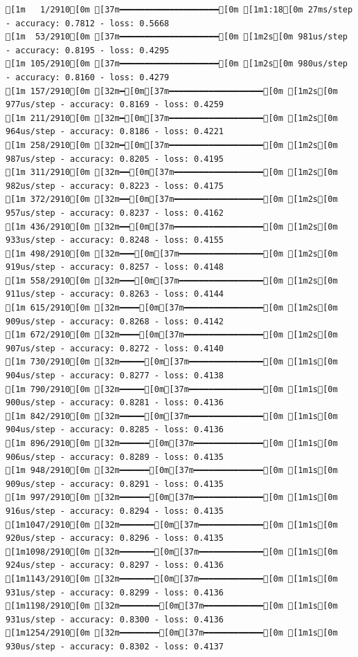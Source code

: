 \documentclass[
  letterpaper,
  DIV=11,
  numbers=noendperiod]{scrartcl}
\begin{document}
\begin{verbatim}
[1m   1/2910[0m [37m━━━━━━━━━━━━━━━━━━━━[0m [1m1:18[0m 27ms/step - accuracy: 0.7812 - loss: 0.5668
[1m  53/2910[0m [37m━━━━━━━━━━━━━━━━━━━━[0m [1m2s[0m 981us/step - accuracy: 0.8195 - loss: 0.4295 
[1m 105/2910[0m [37m━━━━━━━━━━━━━━━━━━━━[0m [1m2s[0m 980us/step - accuracy: 0.8160 - loss: 0.4279
[1m 157/2910[0m [32m━[0m[37m━━━━━━━━━━━━━━━━━━━[0m [1m2s[0m 977us/step - accuracy: 0.8169 - loss: 0.4259
[1m 211/2910[0m [32m━[0m[37m━━━━━━━━━━━━━━━━━━━[0m [1m2s[0m 964us/step - accuracy: 0.8186 - loss: 0.4221
[1m 258/2910[0m [32m━[0m[37m━━━━━━━━━━━━━━━━━━━[0m [1m2s[0m 987us/step - accuracy: 0.8205 - loss: 0.4195
[1m 311/2910[0m [32m━━[0m[37m━━━━━━━━━━━━━━━━━━[0m [1m2s[0m 982us/step - accuracy: 0.8223 - loss: 0.4175
[1m 372/2910[0m [32m━━[0m[37m━━━━━━━━━━━━━━━━━━[0m [1m2s[0m 957us/step - accuracy: 0.8237 - loss: 0.4162
[1m 436/2910[0m [32m━━[0m[37m━━━━━━━━━━━━━━━━━━[0m [1m2s[0m 933us/step - accuracy: 0.8248 - loss: 0.4155
[1m 498/2910[0m [32m━━━[0m[37m━━━━━━━━━━━━━━━━━[0m [1m2s[0m 919us/step - accuracy: 0.8257 - loss: 0.4148
[1m 558/2910[0m [32m━━━[0m[37m━━━━━━━━━━━━━━━━━[0m [1m2s[0m 911us/step - accuracy: 0.8263 - loss: 0.4144
[1m 615/2910[0m [32m━━━━[0m[37m━━━━━━━━━━━━━━━━[0m [1m2s[0m 909us/step - accuracy: 0.8268 - loss: 0.4142
[1m 672/2910[0m [32m━━━━[0m[37m━━━━━━━━━━━━━━━━[0m [1m2s[0m 907us/step - accuracy: 0.8272 - loss: 0.4140
[1m 730/2910[0m [32m━━━━━[0m[37m━━━━━━━━━━━━━━━[0m [1m1s[0m 904us/step - accuracy: 0.8277 - loss: 0.4138
[1m 790/2910[0m [32m━━━━━[0m[37m━━━━━━━━━━━━━━━[0m [1m1s[0m 900us/step - accuracy: 0.8281 - loss: 0.4136
[1m 842/2910[0m [32m━━━━━[0m[37m━━━━━━━━━━━━━━━[0m [1m1s[0m 904us/step - accuracy: 0.8285 - loss: 0.4136
[1m 896/2910[0m [32m━━━━━━[0m[37m━━━━━━━━━━━━━━[0m [1m1s[0m 906us/step - accuracy: 0.8289 - loss: 0.4135
[1m 948/2910[0m [32m━━━━━━[0m[37m━━━━━━━━━━━━━━[0m [1m1s[0m 909us/step - accuracy: 0.8291 - loss: 0.4135
[1m 997/2910[0m [32m━━━━━━[0m[37m━━━━━━━━━━━━━━[0m [1m1s[0m 916us/step - accuracy: 0.8294 - loss: 0.4135
[1m1047/2910[0m [32m━━━━━━━[0m[37m━━━━━━━━━━━━━[0m [1m1s[0m 920us/step - accuracy: 0.8296 - loss: 0.4135
[1m1098/2910[0m [32m━━━━━━━[0m[37m━━━━━━━━━━━━━[0m [1m1s[0m 924us/step - accuracy: 0.8297 - loss: 0.4136
[1m1143/2910[0m [32m━━━━━━━[0m[37m━━━━━━━━━━━━━[0m [1m1s[0m 931us/step - accuracy: 0.8299 - loss: 0.4136
[1m1198/2910[0m [32m━━━━━━━━[0m[37m━━━━━━━━━━━━[0m [1m1s[0m 931us/step - accuracy: 0.8300 - loss: 0.4136
[1m1254/2910[0m [32m━━━━━━━━[0m[37m━━━━━━━━━━━━[0m [1m1s[0m 930us/step - accuracy: 0.8302 - loss: 0.4137

\end{verbatim}
\end{document}
